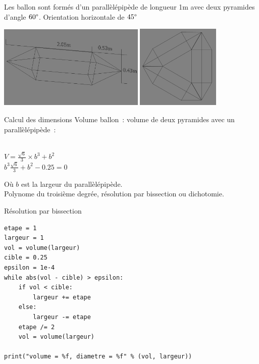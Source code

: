 \begin{frame}
  Les ballon sont formés d'un parallèlépipède de longueur 1m avec deux pyramides d'angle $60\degree$. Orientation horizontale de $45\degree$ \\
  \begin{center}
    \includegraphics[width=7cm]{../Images/ballon.png}
    \includegraphics[width=4cm]{../Images/ballon3.png}
  \end{center}
\end{frame}

\begin{frame}{Calcul des dimensions}
  Volume ballon~: volume de deux pyramides avec un parallèlépipède~:
  \begin{center}
	 \\
	$\displaystyle{V = \frac{\sqrt{6}}{3} \times b^3 + b^2 }$ \\
	$\displaystyle{b^3 \frac{\sqrt{6}}{3} + b^2 - 0.25 = 0}$
  \end{center}
  Où $b$ est la largeur du parallèlépipède. \\
  Polynome du troisième degrée, résolution par bissection ou dichotomie.
\end{frame}

\begin{frame}[fragile]{Résolution par bissection}
  \begin{lstlisting}[frame=single]
etape = 1
largeur = 1
vol = volume(largeur)
cible = 0.25
epsilon = 1e-4
while abs(vol - cible) > epsilon:
	if vol < cible:
		largeur += etape
	else:
		largeur -= etape
	etape /= 2
	vol = volume(largeur)

print("volume = %f, diametre = %f" % (vol, largeur))
  \end{lstlisting}
\end{frame}

